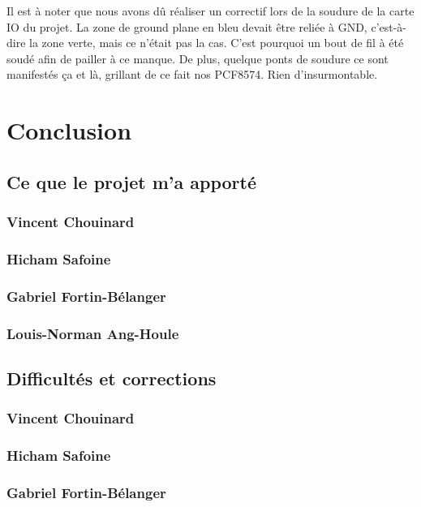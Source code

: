 \documentclass[10pt,a4paper,final]{article}
\begin{document}
\begin{spacing}{1.5}
Il est à noter que nous avons dû réaliser un correctif lors de la soudure de la carte IO du projet. La zone de ground plane en bleu devait être reliée à GND, c'est-à-dire la zone verte, mais ce n'était pas la cas. C'est pourquoi un bout de fil à été soudé afin de pailler à ce manque. De plus, quelque ponts de soudure ce sont manifestés ça et là, grillant de ce fait nos PCF8574. Rien d'insurmontable.


\pagebreak
\section{Conclusion}

\subsection{Ce que le projet m'a apporté}
\subsubsection{Vincent Chouinard}

\subsubsection{Hicham Safoine}

\subsubsection{Gabriel Fortin-Bélanger}

\subsubsection{Louis-Norman Ang-Houle}



\subsection{Difficultés et corrections}
\subsubsection{Vincent Chouinard}

\subsubsection{Hicham Safoine}

\subsubsection{Gabriel Fortin-Bélanger}


\end{spacing}
\end{document}
